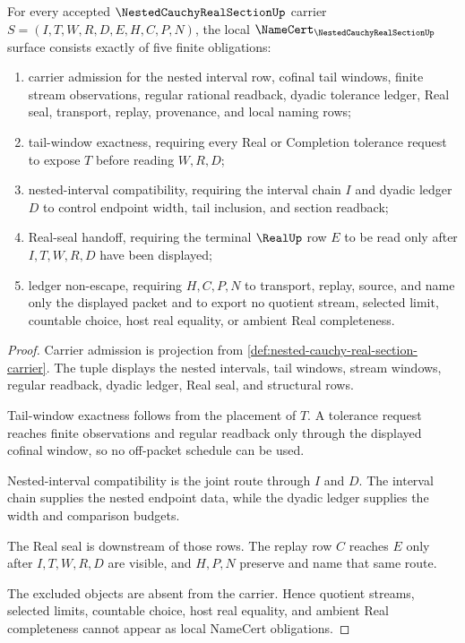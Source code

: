 \begin{theorem}
\label{thm:nested-cauchy-real-section-namecert-obligations}
For every accepted $\NestedCauchyRealSectionUp$ carrier $S=(I,T,W,R,D,E,H,C,P,N)$, the local $\NameCert_{\NestedCauchyRealSectionUp}$ surface consists exactly of five finite obligations:
\begin{enumerate}
\item carrier admission for the nested interval row, cofinal tail windows, finite stream observations, regular rational readback, dyadic tolerance ledger, Real seal, transport, replay, provenance, and local naming rows;
\item tail-window exactness, requiring every Real or Completion tolerance request to expose $T$ before reading $W,R,D$;
\item nested-interval compatibility, requiring the interval chain $I$ and dyadic ledger $D$ to control endpoint width, tail inclusion, and section readback;
\item Real-seal handoff, requiring the terminal $\RealUp$ row $E$ to be read only after $I,T,W,R,D$ have been displayed;
\item ledger non-escape, requiring $H,C,P,N$ to transport, replay, source, and name only the displayed packet and to export no quotient stream, selected limit, countable choice, host real equality, or ambient Real completeness.
\end{enumerate}
\end{theorem}
\begin{proof}
Carrier admission is projection from \autoref{def:nested-cauchy-real-section-carrier}. The tuple displays the nested intervals, tail windows, stream windows, regular readback, dyadic ledger, Real seal, and structural rows.

Tail-window exactness follows from the placement of $T$. A tolerance request reaches finite observations and regular readback only through the displayed cofinal window, so no off-packet schedule can be used.

Nested-interval compatibility is the joint route through $I$ and $D$. The interval chain supplies the nested endpoint data, while the dyadic ledger supplies the width and comparison budgets.

The Real seal is downstream of those rows. The replay row $C$ reaches $E$ only after $I,T,W,R,D$ are visible, and $H,P,N$ preserve and name that same route.

The excluded objects are absent from the carrier. Hence quotient streams, selected limits, countable choice, host real equality, and ambient Real completeness cannot appear as local NameCert obligations.
\end{proof}

